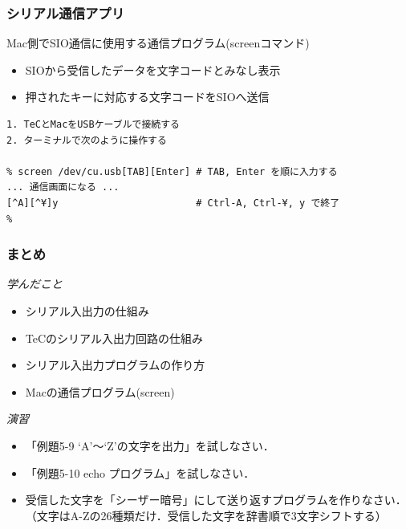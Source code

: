 \documentclass[handout]{beamer}        %
\begin{document}
\begin{frame}[fragile]
  \frametitle{シリアル通信アプリ}
  Mac側でSIO通信に使用する通信プログラム(screenコマンド)
  \begin{itemize}
    \item SIOから受信したデータを文字コードとみなし表示
    \item 押されたキーに対応する文字コードをSIOへ送信
  \end{itemize}

\begin{framed}{\small
\begin{verbatim}
1. TeCとMacをUSBケーブルで接続する
2. ターミナルで次のように操作する

% screen /dev/cu.usb[TAB][Enter] # TAB, Enter を順に入力する
... 通信画面になる ...
[^A][^¥]y                        # Ctrl-A, Ctrl-¥, y で終了
%
\end{verbatim}
}\end{framed}
\end{frame}

\begin{frame}
  \frametitle{まとめ}
  \emph{学んだこと}
  \begin{itemize}
  \item シリアル入出力の仕組み
  \item TeCのシリアル入出力回路の仕組み
  \item シリアル入出力プログラムの作り方
  \item Macの通信プログラム(screen)
  \end{itemize}
  \vfill
  \emph{演習}
  \begin{itemize}
  \item 「例題5-9 `A'〜`Z'の文字を出力」を試しなさい．
  \item 「例題5-10 echo プログラム」を試しなさい．
  \item 受信した文字を「シーザー暗号」にして送り返すプログラムを作りなさい．
  （文字はA-Zの26種類だけ．受信した文字を辞書順で3文字シフトする）
  \end{itemize}
  \vfill
\end{frame}
\end{document}
